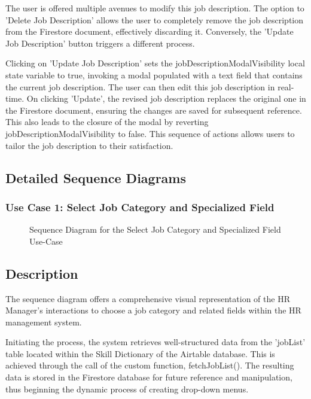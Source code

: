 The user is offered multiple avenues to modify this job description. The option to 'Delete Job Description' allows the user to completely remove the job description from the Firestore document, effectively discarding it. Conversely, the 'Update Job Description' button triggers a different process.

Clicking on 'Update Job Description' sets the jobDescriptionModalVisibility local state variable to true, invoking a modal populated with a text field that contains the current job description. The user can then edit this job description in real-time. On clicking 'Update', the revised job description replaces the original one in the Firestore document, ensuring the changes are saved for subsequent reference. This also leads to the closure of the modal by reverting jobDescriptionModalVisibility to false. This sequence of actions allows users to tailor the job description to their satisfaction.

\newpage
\subsection{Detailed Sequence Diagrams}
\subsubsection{Use Case 1: Select Job Category and Specialized Field} 

\begin{figure}[H]
    \centering
    \caption{ Sequence Diagram for the Select Job Category and Specialized Field Use-Case }
    \label{fig:UseCase1Sprint2_Sequence_Diagram}
\end{figure}

\newpage
\subsection*{Description}
The sequence diagram offers a comprehensive visual representation of the HR Manager's interactions to choose a job category and related fields within the HR management system.

Initiating the process, the system retrieves well-structured data from the 'jobList' table located within the Skill Dictionary of the Airtable database. This is achieved through the call of the custom function, fetchJobList(). The resulting data is stored in the Firestore database for future reference and manipulation, thus beginning the dynamic process of creating drop-down menus.

